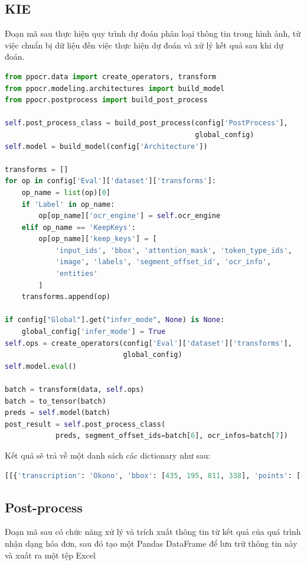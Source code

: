 \subsection{KIE}
Đoạn mã sau thực hiện quy trình dự đoán phân loại thông tin trong hình ảnh, từ việc chuẩn bị dữ liệu đến việc thực hiện dự đoán và xử lý kết quả sau khi dự đoán.
\begin{lstlisting}[language=Python]
from ppocr.data import create_operators, transform
from ppocr.modeling.architectures import build_model
from ppocr.postprocess import build_post_process

self.post_process_class = build_post_process(config['PostProcess'],
                                             global_config)
self.model = build_model(config['Architecture'])

transforms = []
for op in config['Eval']['dataset']['transforms']:
    op_name = list(op)[0]
    if 'Label' in op_name:
        op[op_name]['ocr_engine'] = self.ocr_engine
    elif op_name == 'KeepKeys':
        op[op_name]['keep_keys'] = [
            'input_ids', 'bbox', 'attention_mask', 'token_type_ids',
            'image', 'labels', 'segment_offset_id', 'ocr_info',
            'entities'
        ]
    transforms.append(op)

if config["Global"].get("infer_mode", None) is None:
    global_config['infer_mode'] = True
self.ops = create_operators(config['Eval']['dataset']['transforms'],
                            global_config)
self.model.eval()

batch = transform(data, self.ops)
batch = to_tensor(batch)
preds = self.model(batch)
post_result = self.post_process_class(
            preds, segment_offset_ids=batch[6], ocr_infos=batch[7])
\end{lstlisting}
Kết quả sẽ trả về một danh sách các dictionary như sau:
\begin{lstlisting}[language=Python]
[[{'transcription': 'Okono', 'bbox': [435, 195, 811, 338], 'points': [[437.0, 195.0], [811.0, 201.0], [808.0, 338.0], [435.0, 332.0]], 'pred_id': 1, 'pred': 'SELLER'}, {'transcription': 'Số 85 Lê Văn Hiến, Đức Thắng, Bắc Từ Liêm', 'bbox': [309, 390, 890, 426], 'points': [[309.0, 390.0], [890.0, 392.0], [890.0, 426.0], [309.0, 424.0]], 'pred_id': 3, 'pred': 'ADDRESS'},...]
\end{lstlisting}
\subsection{Post-process}
Đoạn mã sau có chức năng xử lý và trích xuất thông tin từ kết quả của quá trình nhận dạng hóa đơn, sau đó tạo một Pandas DataFrame để lưu trữ thông tin này và xuất ra một tệp Excel

